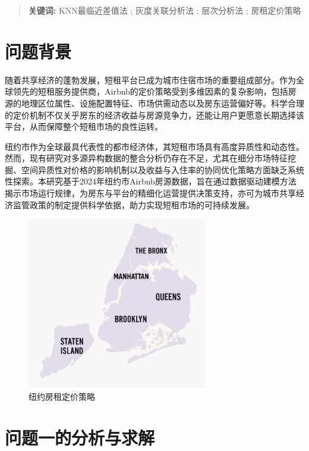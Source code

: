 \documentclass[12pt]{article}
\begin{document}
\begin{CJK}{UTF8}{gbsn}
\begin{abstract}
		\noindent\textbf{关键词:} KNN最临近差值法 ; 灰度关联分析法 ; 层次分析法 ; 房租定价策略
		
		
	\end{abstract}
	
	\newpage
	
	\section{问题背景}
	随着共享经济的蓬勃发展，短租平台已成为城市住宿市场的重要组成部分。作为全球领先的短租服务提供商，Airbnb的定价策略受到多维因素的复杂影响，包括房源的地理区位属性、设施配置特征、市场供需动态以及房东运营偏好等。科学合理的定价机制不仅关乎房东的经济收益与房源竞争力，还能让用户更愿意长期选择该平台，从而保障整个短租市场的良性运转。
	
	纽约市作为全球最具代表性的都市经济体，其短租市场具有高度异质性和动态性。然而，现有研究对多源异构数据的整合分析仍存在不足，尤其在细分市场特征挖掘、空间异质性对价格的影响机制以及收益与入住率的协同优化策略方面缺乏系统性探索。本研究基于2024年纽约市Airbnb房源数据，旨在通过数据驱动建模方法揭示市场运行规律，为房东与平台的精细化运营提供决策支持，亦可为城市共享经济监管政策的制定提供科学依据，助力实现短租市场的可持续发展。
	
	\begin{figure}[H]
		\centering
		\includegraphics[width=0.7\textwidth]{pic/img.jpg} %
		\caption{纽约房租定价策略}
		\label{fig:sample}
	\end{figure}
	
	\section{问题一的分析与求解}

\end{CJK}
\end{document}
